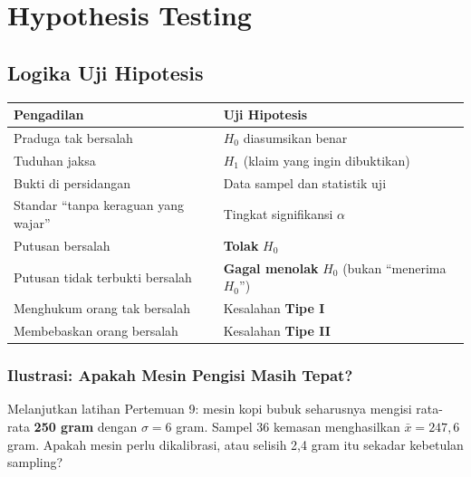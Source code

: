\documentclass[
  indonesian,
  letterpaper,
]{book}
\newcounter{none} %
\begin{document}

\chapter{Hypothesis Testing}\label{hypothesis-testing}

\section{Logika Uji Hipotesis}\label{logika-uji-hipotesis}

{\def\LTcaptype{none} %
\begin{longtable}[]{@{}
  >{\raggedright\arraybackslash}p{}
  >{\raggedright\arraybackslash}p{}@{}}
\toprule\noalign{}
\begin{minipage}[b]{\linewidth}\raggedright
Pengadilan
\end{minipage} & \begin{minipage}[b]{\linewidth}\raggedright
Uji Hipotesis
\end{minipage} \\
\midrule\noalign{}
\endhead
\bottomrule\noalign{}
\endlastfoot
Praduga tak bersalah & \(H_0\) diasumsikan benar \\
Tuduhan jaksa & \(H_1\) (klaim yang ingin dibuktikan) \\
Bukti di persidangan & Data sampel dan statistik uji \\
Standar ``tanpa keraguan yang wajar'' & Tingkat signifikansi
\(\alpha\) \\
Putusan bersalah & \textbf{Tolak} \(H_0\) \\
Putusan tidak terbukti bersalah & \textbf{Gagal menolak} \(H_0\) (bukan
``menerima \(H_0\)'') \\
Menghukum orang tak bersalah & Kesalahan \textbf{Tipe I} \\
Membebaskan orang bersalah & Kesalahan \textbf{Tipe II} \\
\end{longtable}
}

\subsection{Ilustrasi: Apakah Mesin Pengisi Masih
Tepat?}\label{ilustrasi-apakah-mesin-pengisi-masih-tepat}

Melanjutkan latihan Pertemuan 9: mesin kopi bubuk seharusnya mengisi
rata-rata \textbf{250 gram} dengan \(\sigma = 6\) gram. Sampel 36
kemasan menghasilkan \(\bar{x} = 247{,}6\) gram. Apakah mesin perlu
dikalibrasi, atau selisih 2,4 gram itu sekadar kebetulan sampling?
\end{document}
